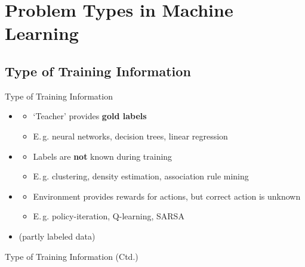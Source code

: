 \section{Problem Types in Machine Learning}

\subsection{Type of Training Information}

\begin{frame}{Type of Training Information}{}
	\begin{itemize}
		\item {}
		\begin{itemize}
			\item `Teacher' provides \textbf{gold labels}
			\item E.\,g. neural networks, decision trees, linear regression
		\end{itemize}
		\item {}
		\begin{itemize}
			\item Labels are \textbf{not} known during training
			\item E.\,g. clustering, density estimation, association rule mining
		\end{itemize}
		\item {}
		\begin{itemize}
			\item Environment provides rewards for actions, but correct action is unknown
			\item E.\,g. policy-iteration, Q-learning, SARSA
		\end{itemize}
		\item {} (partly labeled data)
	\end{itemize}
\end{frame}


\begin{frame}{Type of Training Information (Ctd.)}{}
	
\end{frame}


